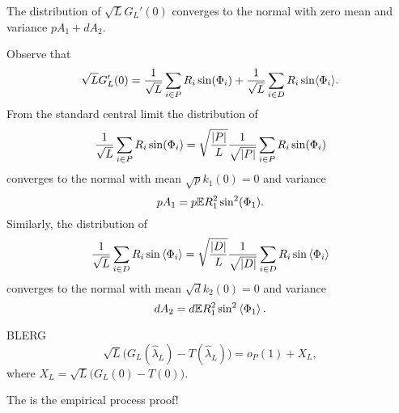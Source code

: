\documentclass[journal]{IEEEtran}
\begin{document}
\begin{lemma}\label{lem:convdistGLdash}
The distribution of $\sqrt{L}G_L'(0)$ converges to the normal with zero mean and variance $pA_1 + dA_2$.
\end{lemma}
\begin{IEEEproof}
Observe that 
\[
\sqrt{L} G_L^\prime(0) = \frac{1}{\sqrt{L}} \sum_{i \in P} R_i \sin(\Phi_i) + \frac{1}{\sqrt{L}} \sum_{i \in D} R_i \sin\langle \Phi_i \rangle.
\]
From the standard central limit the distribution of
\[
\frac{1}{\sqrt{L}} \sum_{i \in P} R_i \sin(\Phi_i) = \sqrt{\frac{{\left\vert P \right\vert}}{L}} \frac{1}{\sqrt{{\left\vert P \right\vert}}} \sum_{i \in P} R_i \sin(\Phi_i) 
\]
converges to the normal with mean $\sqrt{p} k_1(0) = 0$ and variance
\[
p A_1 = p {\mathbb E} R_1^2 \sin^2(\Phi_1).
\]
Similarly, the distribution of 
\[
\frac{1}{\sqrt{L}} \sum_{i \in D} R_i \sin\left\langle \Phi_i \right\rangle = \sqrt{\frac{{\left\vert D \right\vert}}{L}} \frac{1}{\sqrt{{\left\vert D \right\vert}}} \sum_{i \in D} R_i \sin\left\langle \Phi_i \right\rangle 
\]
converges to the normal with mean $\sqrt{d} k_2(0) = 0$ and variance
\[
d A_2 = d {\mathbb E} R_1^2 \sin^2\left\langle \Phi_1 \right\rangle.
\]
\end{IEEEproof}


\begin{lemma}\label{lem:empiricprocforrho} BLERG
\[
\sqrt{L}\big( G_L(\hat{\lambda}_L) - T(\hat{\lambda}_L) \big) = o_P(1) + X_L,
\]
where $X_L = \sqrt{L} \big( G_L(0) - T(0) \big)$.
\end{lemma}
\begin{IEEEproof}
The is the empirical process proof!
\end{IEEEproof}
\end{document}
